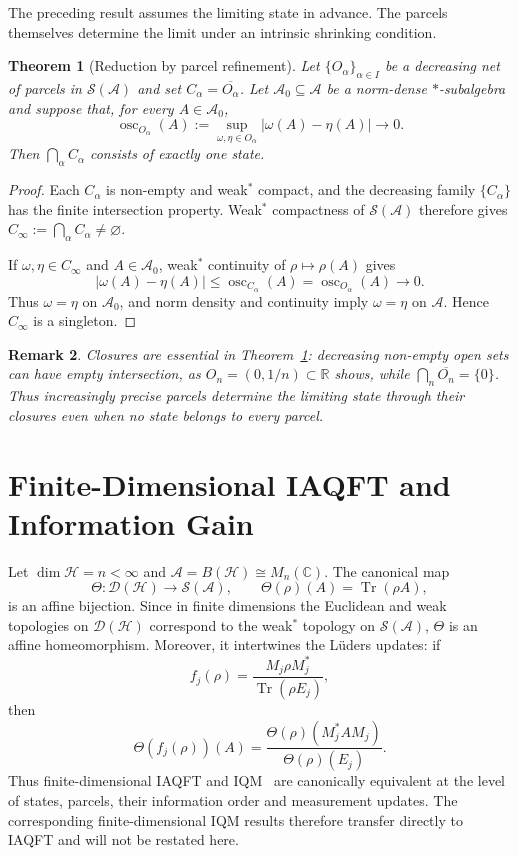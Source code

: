 \documentclass[11pt]{article}
\newtheorem{theorem}{Theorem}[section]
\newtheorem{remark}[theorem]{Remark}
\newcommand{\A}{\mathcal{A}}
\begin{document}
The preceding result assumes the limiting state in advance. The parcels
themselves determine the limit under an intrinsic shrinking condition.

\begin{theorem}[Reduction by parcel refinement]
\label{thm:reduction}
Let $\{O_\alpha\}_{\alpha\in I}$ be a decreasing net of parcels in
$\mathcal S(\A)$ and set $C_\alpha=\overline{O_\alpha}$. Let
$\A_0\subseteq\A$ be a norm-dense $*$-subalgebra and suppose that, for
every $A\in\A_0$,
\[
\operatorname{osc}_{O_\alpha}(A)
:=
\sup_{\omega,\eta\in O_\alpha}|\omega(A)-\eta(A)|
\longrightarrow0.
\]
Then $\bigcap_\alpha C_\alpha$ consists of exactly one state.
\end{theorem}

\begin{proof}
Each $C_\alpha$ is non-empty and weak$^*$ compact, and the decreasing
family $\{C_\alpha\}$ has the finite intersection property. Weak$^*$
compactness of $\mathcal S(\A)$ therefore gives
$C_\infty:=\bigcap_\alpha C_\alpha\neq\varnothing$.

If $\omega,\eta\in C_\infty$ and $A\in\A_0$, weak$^*$ continuity of
$\rho\mapsto\rho(A)$ gives
\[
|\omega(A)-\eta(A)|
\leq
\operatorname{osc}_{C_\alpha}(A)
=
\operatorname{osc}_{O_\alpha}(A)
\longrightarrow0.
\]
Thus $\omega=\eta$ on $\A_0$, and norm density and continuity imply
$\omega=\eta$ on $\A$. Hence $C_\infty$ is a singleton.
\end{proof}

\begin{remark}
Closures are essential in Theorem~\ref{thm:reduction}: decreasing
non-empty open sets can have empty intersection, as
$O_n=(0,1/n)\subset\mathbb R$ shows, while
$\bigcap_n\overline{O_n}=\{0\}$. Thus increasingly precise parcels
determine the limiting state through their closures even when no state
belongs to every parcel.
\end{remark}
\section{Finite-Dimensional IAQFT and Information Gain}
\label{sec:finite}

Let $\dim\mathcal H=n<\infty$ and
$\mathcal A=B(\mathcal H)\cong M_n(\mathbb C)$. The canonical map
\[
\Theta:\mathcal D(\mathcal H)\longrightarrow\mathcal S(\mathcal A),
\qquad
\Theta(\rho)(A)=\operatorname{Tr}(\rho A),
\]
is an affine bijection. Since in finite dimensions the Euclidean and weak
topologies on $\mathcal D(\mathcal H)$ correspond to the weak$^*$ topology
on $\mathcal S(\mathcal A)$, $\Theta$ is an affine homeomorphism. Moreover,
it intertwines the L\"uders updates: if
\[
f_j(\rho)
=
\frac{M_j\rho M_j^*}{\operatorname{Tr}(\rho E_j)},
\]
then
\[
\Theta(f_j(\rho))(A)
=
\frac{\Theta(\rho)(M_j^*AM_j)}{\Theta(\rho)(E_j)}.
\]
Thus finite-dimensional IAQFT and IQM~\cite{Edalat2026} are canonically
equivalent at the level of states, parcels, their information order and
measurement updates. The corresponding finite-dimensional IQM results
therefore transfer directly to IAQFT and will not be restated here.
\end{document}
